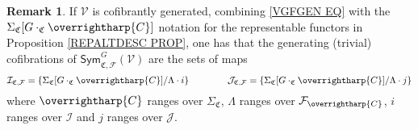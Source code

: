 \documentclass[a4paper,10pt
]{article}%
\numberwithin{equation}{section}
\numberwithin{figure}{section}
\theoremstyle{definition} %
\newtheorem{remark}[equation]{Remark}%
\newcommand{\vect}[1]{\text{\overrightharp{\ensuremath{#1}}}}
\newcommand{\Sym}{\ensuremath{\mathsf{Sym}}}%
\newcommand{\F}{\ensuremath{\mathcal F}}
\newcommand{\V}{\ensuremath{\mathcal V}}
\newcommand{\1}{\ensuremath{\mathbbm 1}}%
\begin{document}
\begin{remark}\label{VGSIGF REM}
	If $\V$ is cofibrantly generated,
	combining \eqref{VGFGEN EQ} with the 
	$\Sigma_{\mathfrak{C}}[G \cdot_{\mathfrak{C}} \vect{C}]$ notation
	for the representable functors 
	in Proposition \ref{REPALTDESC PROP},
	one has that the generating (trivial) cofibrations of
	$\Sym^{G}_{\mathfrak{C},\F}(\V)$
	are the sets of maps
	\begin{equation}\label{VGSIGF EQ}
	\mathcal{I}_{\mathfrak{C},\mathcal{F}}
	=
	\left\{
	\Sigma_{\mathfrak{C}}[G \cdot_{\mathfrak{C}} \vect{C}]/\Lambda \cdot i
	\right\}
	\qquad \qquad
	\mathcal{J}_{\mathfrak{C},\mathcal{F}}
	=
	\left\{
	\Sigma_{\mathfrak{C}}[G \cdot_{\mathfrak{C}} \vect{C}]/\Lambda \cdot j
	\right\}
	\end{equation}
	where $\vect{C}$ ranges over $\Sigma_{\mathfrak{C}}$,
	$\Lambda$ ranges over $\F_{\vect{C}}$,
	$i$ ranges over $\mathcal{I}$ and
	$j$ ranges over $\mathcal{J}$.
\end{remark}
\end{document}
